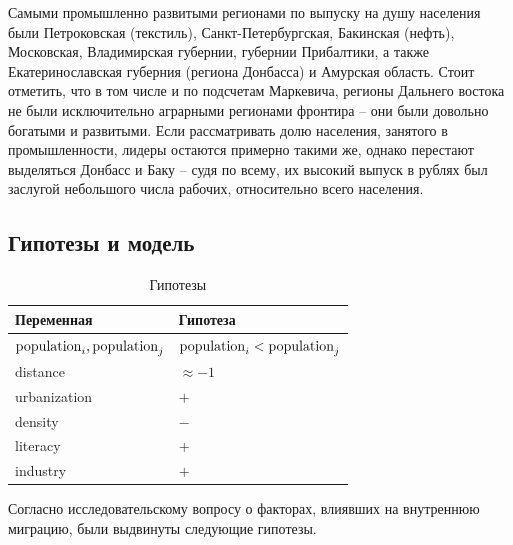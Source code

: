 \documentclass[a4paper,12pt]{article}
\begin{document}
Самыми промышленно развитыми регионами по выпуску на душу населения были Петроковская (текстиль), Санкт-Петербургская, Бакинская (нефть), Московская, Владимирская губернии, губернии Прибалтики, а также Екатеринославская губерния (региона Донбасса) и Амурская область. Стоит отметить, что в том числе и по подсчетам Маркевича, регионы Дальнего востока не были исключительно аграрными регионами фронтира – они были довольно богатыми и развитыми. Если рассматривать долю населения, занятого в промышленности, лидеры остаются примерно такими же, однако перестают выделяться Донбасс и Баку – судя по всему, их высокий выпуск в рублях был заслугой небольшого числа рабочих, относительно всего населения.

\subsection{Гипотезы и модель}

\begin{table}[h]    
	\caption{Гипотезы}
	\label{table:hypo}
	\centering
	\begin{tabular}{@{}ll@{}}
		\toprule
		Переменная                   & Гипотеза                              \\ 
		\midrule
		$\textup{population}_i, \textup{population}_j$ & $\textup{population}_i < \textup{population}_j$ \\
		distance                     & $\approx-1$                            \\
		urbanization                 & $+$                                    \\
		density                      & $-$                                    \\
		literacy                     & $+$                                    \\
		industry                     & $+$                                    \\
		\bottomrule
	\end{tabular}
\end{table}

Согласно исследовательскому вопросу о факторах, влиявших на внутреннюю миграцию, были выдвинуты следующие гипотезы.
\end{document}
